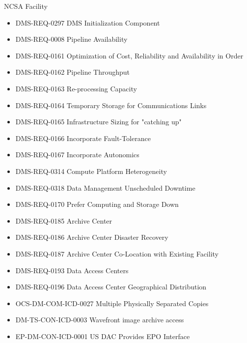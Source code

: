 NCSA Facility \begin{itemize}
\item DMS-REQ-0297 DMS Initialization Component
\item DMS-REQ-0008 Pipeline Availability
\item DMS-REQ-0161 Optimization of Cost, Reliability and Availability in Order
\item DMS-REQ-0162 Pipeline Throughput
\item DMS-REQ-0163 Re-processing Capacity
\item DMS-REQ-0164 Temporary Storage for Communications Links
\item DMS-REQ-0165 Infrastructure Sizing for "catching up"
\item DMS-REQ-0166 Incorporate Fault-Tolerance
\item DMS-REQ-0167 Incorporate Autonomics
\item DMS-REQ-0314 Compute Platform Heterogeneity
\item DMS-REQ-0318 Data Management Unscheduled Downtime
\item DMS-REQ-0170 Prefer Computing and Storage Down
\item DMS-REQ-0185 Archive Center
\item DMS-REQ-0186 Archive Center Disaster Recovery
\item DMS-REQ-0187 Archive Center Co-Location with Existing Facility
\item DMS-REQ-0193 Data Access Centers
\item DMS-REQ-0196 Data Access Center Geographical Distribution
\item OCS-DM-COM-ICD-0027 Multiple Physically Separated Copies
\item DM-TS-CON-ICD-0003 Wavefront image archive access
\item EP-DM-CON-ICD-0001 US DAC Provides EPO Interface
\end{itemize}
